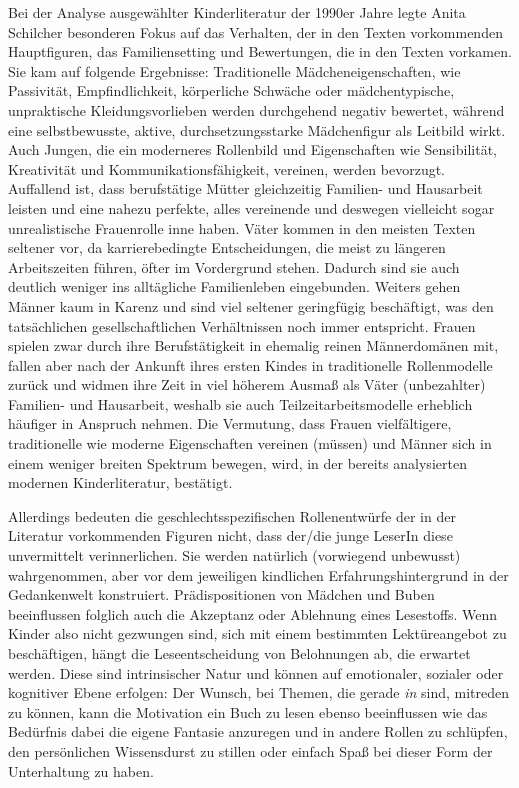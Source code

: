  Bei der Analyse ausgewählter Kinderliteratur der 1990er Jahre legte Anita Schilcher besonderen Fokus auf das Verhalten, der in den Texten vorkommenden Hauptfiguren, das Familiensetting und Bewertungen, die in den Texten vorkamen. Sie kam auf folgende Ergebnisse: Traditionelle Mädcheneigenschaften, wie Passivität, Empfindlichkeit, körperliche Schwäche oder mädchentypische, unpraktische Kleidungsvorlieben werden durchgehend negativ bewertet, während eine selbstbewusste, aktive, durchsetzungsstarke Mädchenfigur als Leitbild wirkt. Auch Jungen, die ein moderneres Rollenbild und Eigenschaften wie Sensibilität, Kreativität und Kommunikationsfähigkeit, vereinen, werden bevorzugt. Auffallend ist, dass berufstätige Mütter gleichzeitig Familien- und Hausarbeit leisten und eine nahezu perfekte, alles vereinende und deswegen vielleicht sogar unrealistische Frauenrolle inne haben. Väter kommen in den meisten Texten seltener vor, da karrierebedingte Entscheidungen, die meist zu längeren Arbeitszeiten führen, öfter im Vordergrund stehen. Dadurch sind sie auch deutlich weniger ins alltägliche Familienleben eingebunden. Weiters gehen Männer kaum in Karenz und sind viel seltener geringfügig beschäftigt, was den tatsächlichen gesellschaftlichen Verhältnissen noch immer entspricht. Frauen spielen zwar durch ihre Berufstätigkeit in ehemalig reinen Männerdomänen mit, fallen aber nach der Ankunft ihres ersten Kindes in traditionelle Rollenmodelle zurück und widmen ihre Zeit in viel höherem Ausmaß als Väter (unbezahlter) Familien- und Hausarbeit, weshalb sie auch Teilzeitarbeitsmodelle  erheblich häufiger in Anspruch nehmen. Die Vermutung, dass Frauen vielfältigere, traditionelle wie moderne Eigenschaften vereinen (müssen) und Männer sich in einem weniger breiten Spektrum bewegen, wird, in der bereits analysierten modernen Kinderliteratur, bestätigt.
        

Allerdings bedeuten die geschlechtsspezifischen Rollenentwürfe der in der Literatur vorkommenden Figuren nicht, dass der/die junge LeserIn diese unvermittelt verinnerlichen. Sie werden natürlich (vorwiegend unbewusst) wahrgenommen, aber vor dem jeweiligen kindlichen Erfahrungshintergrund  in der Gedankenwelt konstruiert. Prädispositionen von Mädchen und Buben beeinflussen folglich auch die Akzeptanz oder Ablehnung eines Lesestoffs. Wenn Kinder also nicht gezwungen sind, sich mit einem bestimmten Lektüreangebot zu beschäftigen, hängt die Leseentscheidung von Belohnungen ab, die erwartet werden. Diese sind intrinsischer Natur und können auf emotionaler, sozialer oder kognitiver Ebene erfolgen: Der Wunsch, bei Themen, die gerade \emph{in} sind, mitreden zu können, kann die Motivation ein Buch zu lesen ebenso beeinflussen wie das Bedürfnis dabei die eigene Fantasie anzuregen und in andere Rollen zu schlüpfen, den persönlichen Wissensdurst zu stillen oder einfach Spaß bei dieser Form der Unterhaltung zu haben. \parencite[547\psq]{Kuhn2010}

